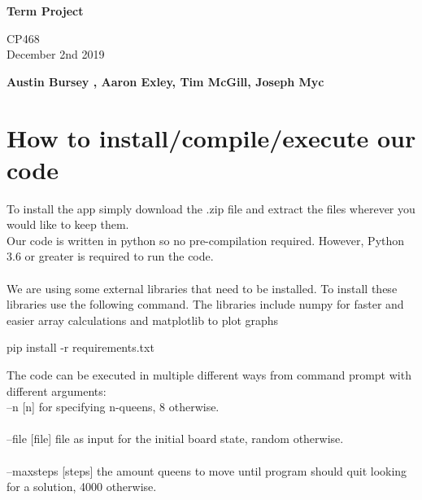 \documentclass{article}
\begin{document}
\begin{titlepage}
  \pagestyle{fancy}
  \thispagestyle{fancy}
   \begin{center}
       \vspace*{1cm}
 
      \Huge
       \textbf{Term Project}
 
       \vspace{0.5cm}
       \Large
        CP468 \\ December 2nd 2019
 
       \vspace{1.5cm}
 
       \textbf{Austin Bursey , Aaron Exley, Tim McGill, Joseph Myc}
 
       \vfill

       \vspace{0.8cm}
 
   \end{center}
\end{titlepage}
\setcounter{page}{2}

\section{How to install/compile/execute our code}
To install the app simply download the .zip file and extract the files wherever you would like to keep them.
\\
Our code is written in python so no pre-compilation required. However, Python 3.6 or greater is required to run the code. \\
\\
We are using some external libraries that need to be installed.  To install these libraries use the following command. The libraries include numpy for faster and easier array calculations and matplotlib to plot graphs\\
\begin{center}
pip install -r requirements.txt
\end{center}
The code can be executed in multiple different ways from command prompt with different arguments:\\

--n [n] for specifying n-queens, 8 otherwise.\\
\\
--file [file] file as input for the initial board state, random otherwise.\\
\\
--maxsteps [steps] the amount queens to move until program should quit looking for a solution, 4000 otherwise. \\
\end{document}
